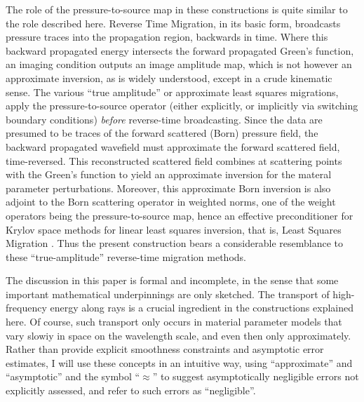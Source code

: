 \documentclass[12pt]{geophysics}
\begin{document}
The role of the pressure-to-source map in these constructions is quite
similar to the role described here. Reverse Time Migration, in its
basic form, broadcasts pressure traces into the propagation region,
backwards in time. Where this backward propagated energy intersects
the forward propagated Green's function, an imaging condition outputs
an image amplitude map, which is not however an approximate inversion,
as is widely understood, except in a crude kinematic sense. The
various ``true amplitude'' or approximate least squares migrations,
apply the pressure-to-source operator (either explicitly, or
implicitly via switching boundary conditions) {\em before}
reverse-time broadcasting. Since the data are presumed to be traces of
the forward scattered (Born) pressure field, the backward propagated
wavefield must approximate the forward scattered field,
time-reversed. This reconstructed scattered field combines at
scattering points with the Green's function to yield an approximate
inversion for the materal parameter perturbations. Moreover, this
approximate Born inversion is also adjoint to the Born scattering operator in weighted norms, one
of the weight operators being the pressure-to-source map, hence an
effective preconditioner for Krylov space methods for linear least
squares inversion, that is, Least Squares Migration
\cite[]{HouSymes:16}. Thus the present construction bears a
considerable resemblance to these ``true-amplitude'' reverse-time
migration methods.

The discussion in this paper is formal and incomplete, in the sense
that some important mathematical underpinnings are only
sketched. The transport of high-frequency energy along rays is a
crucial ingredient in the constructions explained here. Of course,
such transport only occurs in material parameter models that vary
slowiy in space on the wavelength scale, and even then only
approximately. Rather than provide explicit
smoothness constraints and asymptotic error estimates, I will use
these concepts in an intuitive way, using ``approximate'' and
``asymptotic'' and the symbol ``$\approx$'' to suggest asymptotically
negligible errors not explicitly assessed, and refer to such errors as
``negligible''.
\end{document}
